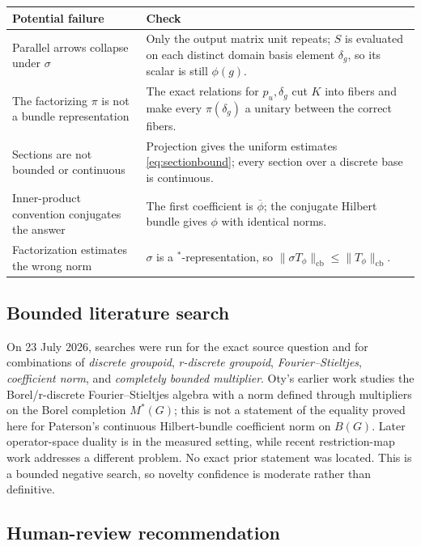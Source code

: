 \documentclass[11pt]{article}
\theoremstyle{remark}
\newcommand{\cb}{\mathrm{cb}}
\begin{document}
\begin{center}
\begin{tabular}{@{}>{\raggedright\arraybackslash}p{}
>{\raggedright\arraybackslash}p{}@{}}
\toprule
Potential failure & Check \\
\midrule
Parallel arrows collapse under \(\sigma\) &
Only the output matrix unit repeats; \(S\) is evaluated on each distinct
domain basis element \(\delta_g\), so its scalar is still \(\phi(g)\).\\
The factorizing \(\pi\) is not a bundle representation &
The exact relations for \(p_u,\delta_g\) cut \(K\) into fibers and make every
\(\pi(\delta_g)\) a unitary between the correct fibers.\\
Sections are not bounded or continuous &
Projection gives the uniform estimates \eqref{eq:sectionbound}; every section
over a discrete base is continuous.\\
Inner-product convention conjugates the answer &
The first coefficient is \(\overline\phi\); the conjugate Hilbert bundle gives
\(\phi\) with identical norms.\\
Factorization estimates the wrong norm &
\(\sigma\) is a \(^{*}\)-representation, so
\(\|\sigma T_\phi\|_{\cb}\leq\|T_\phi\|_{\cb}\).\\
\bottomrule
\end{tabular}
\end{center}

\subsection*{Bounded literature search}

On 23 July 2026, searches were run for the exact source question and for
combinations of \emph{discrete groupoid}, \emph{r-discrete groupoid},
\emph{Fourier--Stieltjes}, \emph{coefficient norm}, and
\emph{completely bounded multiplier}.  Oty's earlier work \cite{Oty} studies
the Borel/r-discrete Fourier--Stieltjes algebra with a norm defined through
multipliers on the Borel completion \(M^*(G)\); this is not a statement of
the equality proved here for Paterson's continuous Hilbert-bundle coefficient
norm on \(B(G)\).  Later operator-space duality \cite{Paterson2011} is in the
measured setting, while recent restriction-map work \cite{DG2025} addresses a
different problem.  No exact prior statement was located.  This is a bounded
negative search, so novelty confidence is moderate rather than definitive.

\subsection*{Human-review recommendation}
\end{document}
